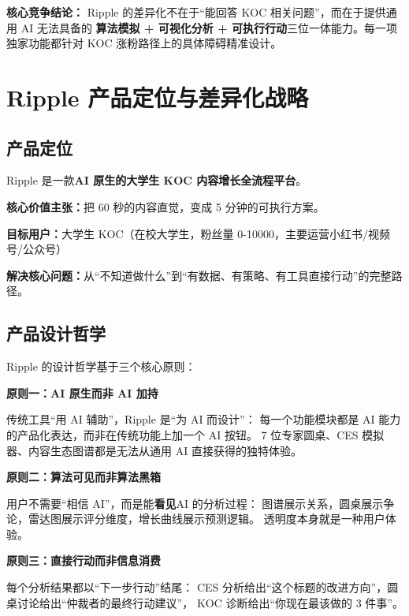 \documentclass[12pt,a4paper]{ctexart}
\newenvironment{keybox}[1]{%
  \begin{tcolorbox}[colback=primary!8,colframe=primary,
    title={\textbf{#1}},fonttitle=\color{white}\bfseries,
    coltitle=white,left=6pt,right=6pt,top=4pt,bottom=4pt,
    arc=4pt]
}{%
  \end{tcolorbox}
  \vspace{0.3cm}
}
\begin{document}
\vspace{0.3cm}
\begin{tcolorbox}[colback=success!8,colframe=success,arc=5pt,
  left=8pt,right=8pt,top=6pt,bottom=6pt]
\textbf{核心竞争结论：} Ripple 的差异化不在于``能回答 KOC 相关问题''，而在于提供通用 AI 无法具备的
\textbf{算法模拟 + 可视化分析 + 可执行行动}三位一体能力。每一项独家功能都针对 KOC 涨粉路径上的具体障碍精准设计。
\end{tcolorbox}


\section{Ripple 产品定位与差异化战略}

\subsection{产品定位}

\begin{keybox}{产品定位陈述}
Ripple 是一款\textbf{AI 原生的大学生 KOC 内容增长全流程平台}。

\textbf{核心价值主张：}把 60 秒的内容直觉，变成 5 分钟的可执行方案。

\textbf{目标用户：}大学生 KOC（在校大学生，粉丝量 0-10000，主要运营小红书/视频号/公众号）

\textbf{解决核心问题：}从``不知道做什么''到``有数据、有策略、有工具直接行动''的完整路径。
\end{keybox}

\subsection{产品设计哲学}

Ripple 的设计哲学基于三个核心原则：

\textbf{原则一：AI 原生而非 AI 加持}

传统工具``用 AI 辅助''，Ripple 是``为 AI 而设计''：
每一个功能模块都是 AI 能力的产品化表达，而非在传统功能上加一个 AI 按钮。
7 位专家圆桌、CES 模拟器、内容生态图谱都是无法从通用 AI 直接获得的独特体验。

\textbf{原则二：算法可见而非算法黑箱}

用户不需要``相信 AI''，而是能\textbf{看见}AI 的分析过程：
图谱展示关系，圆桌展示争论，雷达图展示评分维度，增长曲线展示预测逻辑。
透明度本身就是一种用户体验。

\textbf{原则三：直接行动而非信息消费}

每个分析结果都以``下一步行动''结尾：
CES 分析给出``这个标题的改进方向''，圆桌讨论给出``仲裁者的最终行动建议''，
KOC 诊断给出``你现在最该做的 3 件事''。
\end{document}
